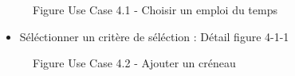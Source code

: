 \documentclass[a4paper, 11pt]{article}
\begin{document}
	\begin{figure}[h]
        \caption{Figure Use Case 4.1 - Choisir un emploi du temps}
        \label{fig-diag-use-case-4-1}
        \end{figure}
        \begin{itemize}
        \item Séléctionner un critère de séléction : Détail figure 4-1-1
        \end{itemize}
	\clearpage
	\begin{figure}[h]
        \caption{Figure Use Case 4.2 - Ajouter un créneau}
        \label{fig-diag-use-case-4-2}
        \end{figure}
\end{document}
